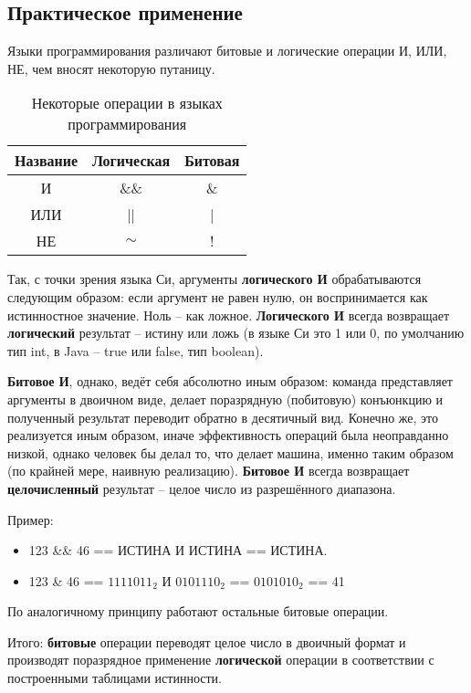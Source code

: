 \subsection{Практическое применение}
\begin{remark}
	Языки программирования различают битовые и логические операции И, ИЛИ, НЕ, чем вносят некоторую путаницу. 
	
	\begin{table}[H]
		\begin{center}
			\begin{tabular}{|c|c|c|}
				\hline
				Название & Логическая & Битовая\\
				\hline
				И & \&\& & \&\\
				\hline
				ИЛИ & || & |\\
				\hline
				НЕ & $\sim$ & !\\
				\hline
			\end{tabular}
			\caption{Некоторые операции в языках программирования}
		\end{center}
	\end{table}
	
	Так, с точки зрения языка Си, аргументы \textbf{логического И} обрабатываются следующим образом: если аргумент не равен нулю, он воспринимается как истинностное значение. Ноль -- как ложное. \textbf{Логического И} всегда возвращает \textbf{логический} результат -- истину или ложь (в языке Си это 1 или 0, по умолчанию тип int, в Java -- true или false, тип boolean).
	
	 \textbf{Битовое И}, однако, ведёт себя абсолютно иным образом: команда представляет аргументы в двоичном виде, делает поразрядную (побитовую) конъюнкцию и полученный результат переводит обратно в десятичный вид. Конечно же, это реализуется иным образом, иначе эффективность операций была неоправданно низкой, однако человек бы делал то, что делает машина, именно таким образом (по крайней мере, наивную реализацию). \textbf{Битовое И} всегда возвращает \textbf{целочисленный} результат -- целое число из разрешённого диапазона.
	
	Пример: 
	\begin{itemize}
		\item 123 \&\& 46 == ИСТИНА И ИСТИНА == ИСТИНА.
		\item 123 \& 46 == $1111011_2$ И $0101110_2$ == $0101010_2$ == 41
	\end{itemize}
	
	По аналогичному принципу работают остальные битовые операции.
	
	Итого: \textbf{битовые} операции переводят целое число в двоичный формат и производят поразрядное применение \textbf{логической} операции в соответствии с построенными таблицами истинности.
\end{remark}

